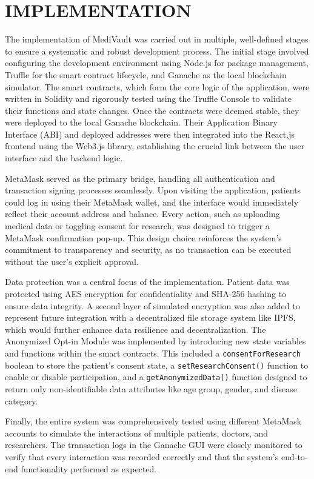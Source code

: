 \chapter{IMPLEMENTATION}
\label{chap:implementation}

The implementation of MediVault was carried out in multiple, well-defined stages to ensure a systematic and robust development process. The initial stage involved configuring the development environment using Node.js for package management, Truffle for the smart contract lifecycle, and Ganache as the local blockchain simulator. The smart contracts, which form the core logic of the application, were written in Solidity and rigorously tested using the Truffle Console to validate their functions and state changes. Once the contracts were deemed stable, they were deployed to the local Ganache blockchain. Their Application Binary Interface (ABI) and deployed addresses were then integrated into the React.js frontend using the Web3.js library, establishing the crucial link between the user interface and the backend logic.

MetaMask served as the primary bridge, handling all authentication and transaction signing processes seamlessly. Upon visiting the application, patients could log in using their MetaMask wallet, and the interface would immediately reflect their account address and balance. Every action, such as uploading medical data or toggling consent for research, was designed to trigger a MetaMask confirmation pop-up. This design choice reinforces the system's commitment to transparency and security, as no transaction can be executed without the user's explicit approval.

Data protection was a central focus of the implementation. Patient data was protected using AES encryption for confidentiality and SHA-256 hashing to ensure data integrity. A second layer of simulated encryption was also added to represent future integration with a decentralized file storage system like IPFS, which would further enhance data resilience and decentralization. The Anonymized Opt-in Module was implemented by introducing new state variables and functions within the smart contracts. This included a \texttt{consentForResearch} boolean to store the patient’s consent state, a \texttt{setResearchConsent()} function to enable or disable participation, and a \texttt{getAnonymizedData()} function designed to return only non-identifiable data attributes like age group, gender, and disease category.

Finally, the entire system was comprehensively tested using different MetaMask accounts to simulate the interactions of multiple patients, doctors, and researchers. The transaction logs in the Ganache GUI were closely monitored to verify that every interaction was recorded correctly and that the system's end-to-end functionality performed as expected.
